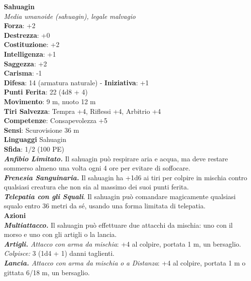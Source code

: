 \begin{multicols}{2}
\medskip\textbf{Sahuagin}\\
\emph{Media umanoide (sahuagin), legale malvagio}\\
\textbf{Forza}: +2\\
\textbf{Destrezza}: +0\\
\textbf{Costituzione}: +2\\
\textbf{Intelligenza}: +1\\
\textbf{Saggezza}: +2\\
\textbf{Carisma}: -1\\
\textbf{Difesa}: 14 (armatura naturale) - \textbf{Iniziativa}: +1\\
\textbf{Punti Ferita}: 22 (4d8 + 4)\\
\textbf{Movimento}: 9 m, nuoto 12 m\\
\textbf{Tiri Salvezza}: Tempra +4, Riflessi +4, Arbitrio +4\\
\textbf{Competenze}: Consapevolezza +5\\
\textbf{Sensi}: Scurovisione 36 m\\
\textbf{Linguaggi} Sahuagin\\
\textbf{Sfida}: 1/2 (100 PE)\smallskip\\
\emph{\textbf{Anfibio Limitato.}} Il sahuagin può respirare aria e acqua, ma deve restare sommerso almeno una volta ogni 4 ore per evitare di soffocare.\\

\emph{\textbf{Frenesia Sanguinaria.}} Il sahuagin ha +1d6 ai tiri per colpire in mischia contro qualsiasi creatura che non sia al massimo dei suoi punti ferita.\\

\emph{\textbf{Telepatia con gli Squali}}. Il sahuagin può comandare magicamente qualsiasi squalo entro 36 metri da sé, usando una forma limitata di telepatia.\\

\smallskip\textbf{Azioni}\\

\emph{\textbf{Multiattacco.}} Il sahuagin può effettuare due attacchi da mischia: uno con il morso e uno con gli artigli o la lancia.\\
\emph{\textbf{Artigli.} Attacco con arma da mischia}: +4 al colpire, portata 1 m, un bersaglio.\\
\emph{Colpisce:} 3 (1d4 + 1) danni taglienti.\\
\emph{\textbf{Lancia.} Attacco con arma da mischia o a Distanza}: +4 al colpire, portata 1 m o gittata 6/18 m, un bersaglio.\\


\end{multicols}
